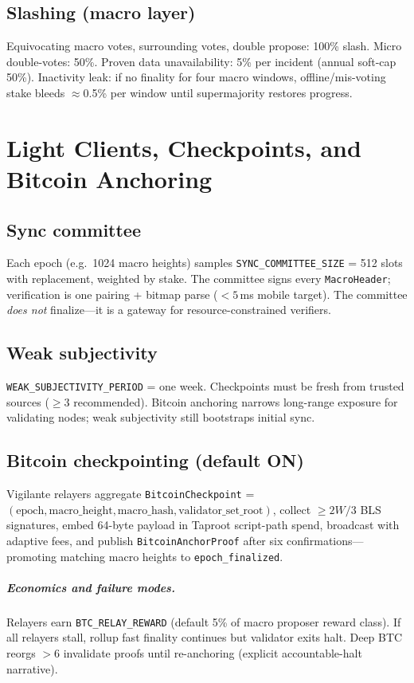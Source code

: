 \documentclass[11pt,a4paper,twoside]{report}
\theoremstyle{definition}
\begin{document}
\section{Slashing (macro layer)}
Equivocating macro votes, surrounding votes, double propose: 100\% slash. Micro double-votes: 50\%. Proven data unavailability: 5\% per incident (annual soft-cap 50\%). Inactivity leak: if no finality for four macro windows, offline/mis-voting stake bleeds $\approx$0.5\% per window until supermajority restores progress.

\chapter{Light Clients, Checkpoints, and Bitcoin Anchoring}

\section{Sync committee}
Each epoch (e.g.\ 1024 macro heights) samples \texttt{SYNC\_COMMITTEE\_SIZE} = 512 slots with replacement, weighted by stake. The committee signs every \texttt{MacroHeader}; verification is one pairing + bitmap parse ($<5$\,ms mobile target). The committee \emph{does not} finalize---it is a gateway for resource-constrained verifiers.

\section{Weak subjectivity}
\texttt{WEAK\_SUBJECTIVITY\_PERIOD} = one week. Checkpoints must be fresh from trusted sources ($\geq 3$ recommended). Bitcoin anchoring narrows long-range exposure for validating nodes; weak subjectivity still bootstraps initial sync.

\section{Bitcoin checkpointing (default ON)}
Vigilante relayers aggregate \texttt{BitcoinCheckpoint} = $(\text{epoch}, \text{macro\_height}, \text{macro\_hash}, \text{validator\_set\_root})$, collect $\geq 2W/3$ BLS signatures, embed 64-byte payload in Taproot script-path spend, broadcast with adaptive fees, and publish \texttt{BitcoinAnchorProof} after six confirmations---promoting matching macro heights to \texttt{epoch\_finalized}.

\paragraph{Economics and failure modes.} Relayers earn \texttt{BTC\_RELAY\_REWARD} (default 5\% of macro proposer reward class). If all relayers stall, rollup fast finality continues but validator exits halt. Deep BTC reorgs $>6$ invalidate proofs until re-anchoring (explicit accountable-halt narrative).
\end{document}
